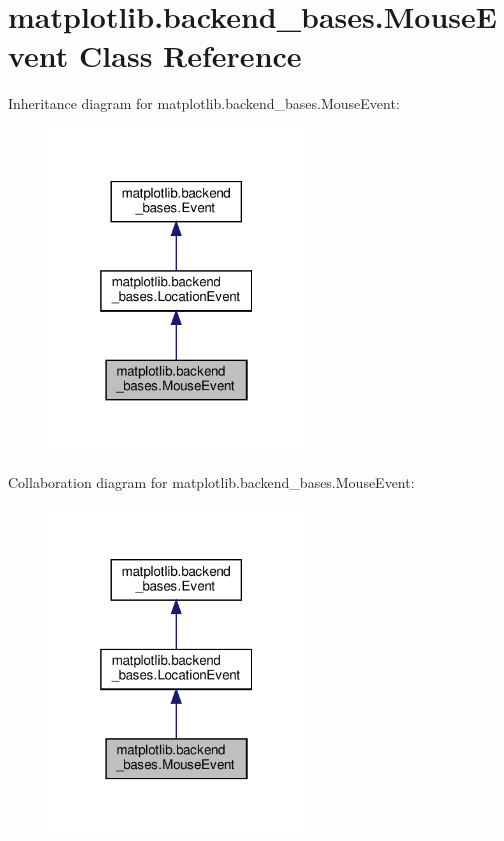 \hypertarget{classmatplotlib_1_1backend__bases_1_1MouseEvent}{}\section{matplotlib.\+backend\+\_\+bases.\+Mouse\+Event Class Reference}
\label{classmatplotlib_1_1backend__bases_1_1MouseEvent}


Inheritance diagram for matplotlib.\+backend\+\_\+bases.\+Mouse\+Event\+:
\nopagebreak
\begin{figure}[H]
\begin{center}
\leavevmode
\includegraphics[width=193pt]{classmatplotlib_1_1backend__bases_1_1MouseEvent__inherit__graph}
\end{center}
\end{figure}


Collaboration diagram for matplotlib.\+backend\+\_\+bases.\+Mouse\+Event\+:
\nopagebreak
\begin{figure}[H]
\begin{center}
\leavevmode
\includegraphics[width=193pt]{classmatplotlib_1_1backend__bases_1_1MouseEvent__coll__graph}
\end{center}
\end{figure}
